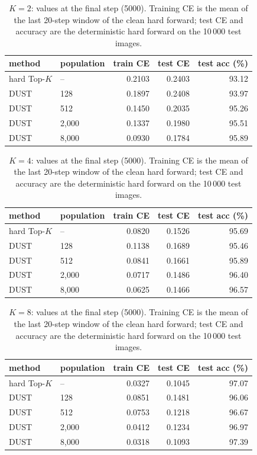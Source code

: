 \begin{table}[H]
\centering
\caption{$K = 2$: values at the final step (5000). Training CE is the mean of the last 20-step window of the clean hard forward; test CE and accuracy are the deterministic hard forward on the 10\,000 test images.}
\label{tab:k2}
\begin{tabular}{llrrr}
\toprule
    method & population & train CE & test CE & test acc (\%) \\
\midrule
    hard Top-$K$ & -- & 0.2103 & 0.2403 & 93.12 \\
    DUST & 128 & 0.1897 & 0.2408 & 93.97 \\
    DUST & 512 & 0.1450 & 0.2035 & 95.26 \\
    DUST & 2,000 & 0.1337 & 0.1980 & 95.51 \\
    DUST & 8,000 & 0.0930 & 0.1784 & 95.89 \\
\bottomrule
\end{tabular}
\end{table}

\begin{table}[H]
\centering
\caption{$K = 4$: values at the final step (5000). Training CE is the mean of the last 20-step window of the clean hard forward; test CE and accuracy are the deterministic hard forward on the 10\,000 test images.}
\label{tab:k4}
\begin{tabular}{llrrr}
\toprule
    method & population & train CE & test CE & test acc (\%) \\
\midrule
    hard Top-$K$ & -- & 0.0820 & 0.1526 & 95.69 \\
    DUST & 128 & 0.1138 & 0.1689 & 95.46 \\
    DUST & 512 & 0.0841 & 0.1661 & 95.89 \\
    DUST & 2,000 & 0.0717 & 0.1486 & 96.40 \\
    DUST & 8,000 & 0.0625 & 0.1466 & 96.57 \\
\bottomrule
\end{tabular}
\end{table}

\begin{table}[H]
\centering
\caption{$K = 8$: values at the final step (5000). Training CE is the mean of the last 20-step window of the clean hard forward; test CE and accuracy are the deterministic hard forward on the 10\,000 test images.}
\label{tab:k8}
\begin{tabular}{llrrr}
\toprule
    method & population & train CE & test CE & test acc (\%) \\
\midrule
    hard Top-$K$ & -- & 0.0327 & 0.1045 & 97.07 \\
    DUST & 128 & 0.0851 & 0.1481 & 96.06 \\
    DUST & 512 & 0.0753 & 0.1218 & 96.67 \\
    DUST & 2,000 & 0.0412 & 0.1234 & 96.97 \\
    DUST & 8,000 & 0.0318 & 0.1093 & 97.39 \\
\bottomrule
\end{tabular}
\end{table}

